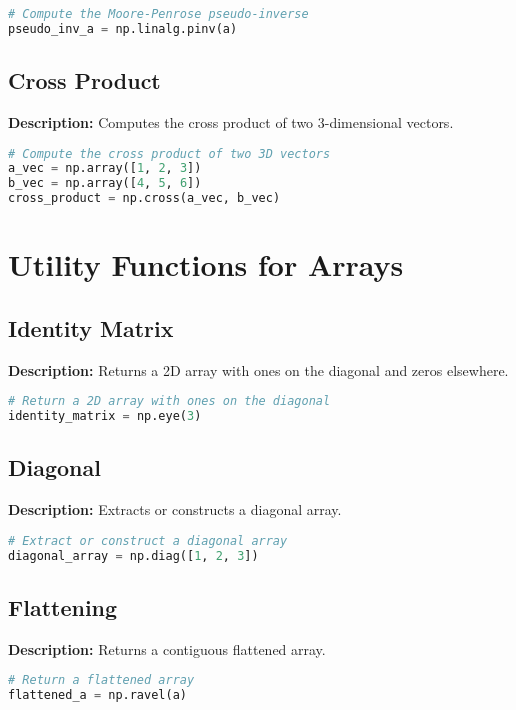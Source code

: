 \documentclass[a4paper, 12pt]{article}
\begin{document}
\begin{lstlisting}[language=Python]
# Compute the Moore-Penrose pseudo-inverse
pseudo_inv_a = np.linalg.pinv(a)
\end{lstlisting}

\subsection{Cross Product}
\textbf{Description:} Computes the cross product of two 3-dimensional vectors.

\begin{lstlisting}[language=Python]
# Compute the cross product of two 3D vectors
a_vec = np.array([1, 2, 3])
b_vec = np.array([4, 5, 6])
cross_product = np.cross(a_vec, b_vec)
\end{lstlisting}

\section{Utility Functions for Arrays}

\subsection{Identity Matrix}
\textbf{Description:} Returns a 2D array with ones on the diagonal and zeros elsewhere.

\begin{lstlisting}[language=Python]
# Return a 2D array with ones on the diagonal
identity_matrix = np.eye(3)
\end{lstlisting}

\subsection{Diagonal}
\textbf{Description:} Extracts or constructs a diagonal array.

\begin{lstlisting}[language=Python]
# Extract or construct a diagonal array
diagonal_array = np.diag([1, 2, 3])
\end{lstlisting}

\subsection{Flattening}
\textbf{Description:} Returns a contiguous flattened array.

\begin{lstlisting}[language=Python]
# Return a flattened array
flattened_a = np.ravel(a)
\end{lstlisting}
\end{document}
